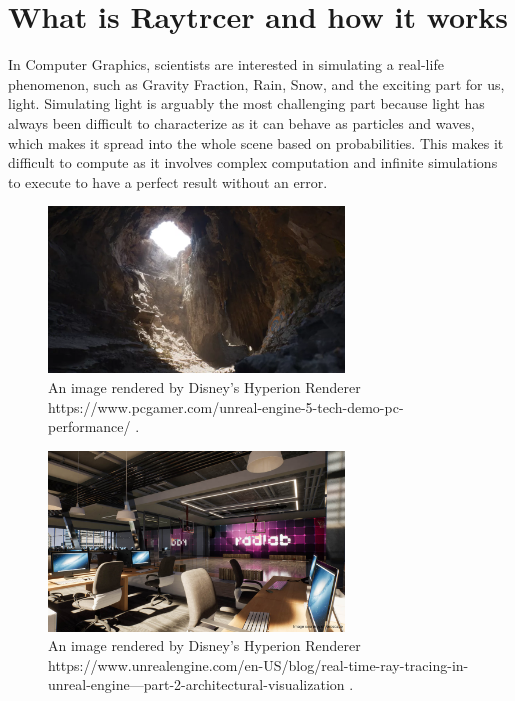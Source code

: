 \documentclass[11pt,a4paper]{article}
\begin{document}
	\section{What is Raytrcer and how it works}
	
	
	
	In Computer Graphics, scientists are interested in simulating a real-life phenomenon, such as Gravity Fraction, Rain, Snow, and the exciting part for us, light.  Simulating light is arguably the most challenging part because light has always been difficult to characterize as it can behave as particles and waves, which makes it spread into the whole scene based on probabilities. This makes it difficult to compute as it involves complex computation and infinite simulations to execute to have a perfect result without an error.
	
	
	\begin{figure}[H] 
		\centering
		\includegraphics[width=0.7\textwidth]{3.png}
		\caption{\centering An image rendered by Disney's Hyperion Renderer 		https://www.pcgamer.com/unreal-engine-5-tech-demo-pc-performance/
			\protect\cite{burley2018design}.}
	\end{figure}
	\noindent
	
	
	\begin{figure}[H] 
		\centering
		\includegraphics[width=0.7\textwidth]{2.jpg}
		\caption{\centering An image rendered by Disney's Hyperion Renderer 		https://www.unrealengine.com/en-US/blog/real-time-ray-tracing-in-unreal-engine---part-2-architectural-visualization
			\protect\cite{burley2018design}.}
	\end{figure}
	\noindent
	
\end{document}
